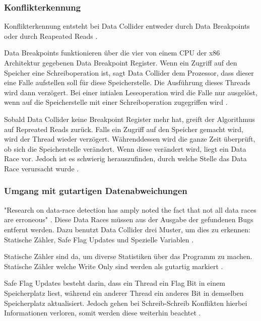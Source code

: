 \subsubsection*{Konflikterkennung}

Konflikterkennung entsteht bei Data Collider entweder durch Data Breakpoints oder durch Reapeated Reads \cite[vgl.][7]{erickson_effective_nodate}.

Data Breakpoints funktionieren über die vier von einem CPU der x86 Architektur gegebenen Data Breakpoint Register. Wenn ein Zugriff auf den Speicher eine Schreiboperation ist, sagt Data Collider dem Prozessor, dass dieser eine Falle aufstellen soll für diese Speicherstelle. Die Ausführung dieses Threads wird dann verzögert. Bei einer intialen Leseoperation wird die Falle nur ausgelöst, wenn auf die Speicherstelle mit einer Schreiboperation zugegriffen wird \cite[vgl.][7-8]{erickson_effective_nodate}.

Sobald Data Collider keine Breakpoint Register mehr hat, greift der Algorithmus auf Repreated Reads zurück. Falls ein Zugriff auf den Speicher gemacht wird, wird der Thread wieder verzögert. Währenddessen wird die ganze Zeit überprüft, ob sich die Speicherstelle verändert. Wenn diese verändert wird, liegt ein Data Race vor. Jedoch ist es schwierig herauszufinden, durch welche Stelle das Data Race verursacht wurde \cite[vgl.][7-8]{erickson_effective_nodate}. 

\subsubsection*{Umgang mit gutartigen Datenabweichungen}

"Research on data-race detection has amply noted the fact that not all data races are erroneous" \cite[8]{erickson_effective_nodate}. Diese Data Races müssen aus der Ausgabe der gefundenen Bugs entfernt werden. Dazu benutzt Data Collider drei Muster, um dies zu erkennen: Statische Zähler, Safe Flag Updates und Spezielle Variablen \cite[vgl.][8]{erickson_effective_nodate}.

Statische Zähler sind da, um diverse Statistiken über das Programm zu machen. Statische Zähler welche Write Only sind werden als gutartig markiert \cite[vgl.][8]{erickson_effective_nodate}.

Safe Flag Updates besteht darin, dass ein Thread ein Flag Bit in einem Speicherplatz liest, während ein anderer Thread ein anderes Bit in demselben Speicherplatz aktualisiert. Jedoch gehen bei Schreib-Schreib Konflikten hierbei Informationen verloren, somit werden diese weiterhin beachtet \cite[vgl.][8]{erickson_effective_nodate}.  

